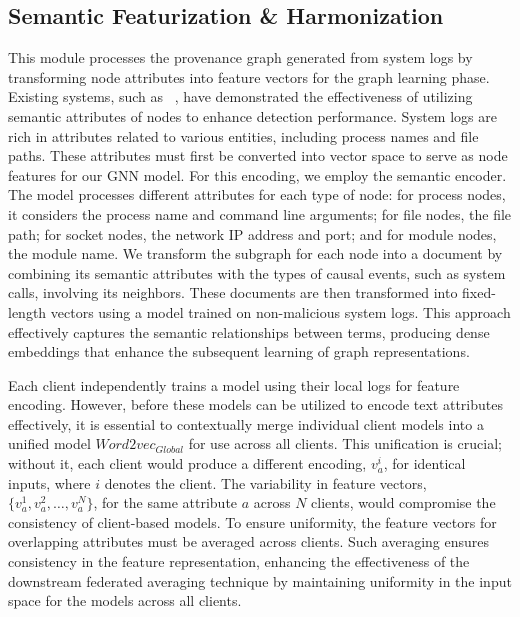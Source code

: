 
\subsection{Semantic Featurization \& Harmonization}
\label{semanfeat}


This module processes the provenance graph generated from system logs by transforming node attributes into feature vectors for the graph learning phase. Existing systems, such as \flash~\cite{flash2024}, have demonstrated the effectiveness of utilizing semantic attributes of nodes to enhance detection performance. System logs are rich in attributes related to various entities, including process names and file paths. These attributes must first be converted into vector space to serve as node features for our GNN model. For this encoding, we employ the \wordvec semantic encoder. The \wordvec model processes different attributes for each type of node: for process nodes, it considers the process name and command line arguments; for file nodes, the file path; for socket nodes, the network IP address and port; and for module nodes, the module name. We transform the subgraph for each node into a document by combining its semantic attributes with the types of causal events, such as system calls, involving its neighbors. These documents are then transformed into fixed-length vectors using a \wordvec model trained on non-malicious system logs. This approach effectively captures the semantic relationships between terms, producing dense embeddings that enhance the subsequent learning of graph representations.

 Each client independently trains a \wordvec model using their local logs for feature encoding. However, before these models can be utilized to encode text attributes effectively, it is essential to contextually merge individual client \wordvec models into a unified model \( Word2vec_{Global} \) for use across all clients. This unification is crucial; without it, each client would produce a different encoding, \(v_a^i\), for identical inputs, where \(i\) denotes the client. The variability in feature vectors, \(\{v_a^1, v_a^2, \ldots, v_a^N\}\), for the same attribute \(a\) across \(N\) clients, would compromise the consistency of client-based \gnnshort models. To ensure uniformity, the feature vectors for overlapping attributes must be averaged across clients. Such averaging ensures consistency in the feature representation, enhancing the effectiveness of the downstream federated averaging technique by maintaining uniformity in the input space for the \gnnshort models across all clients.

